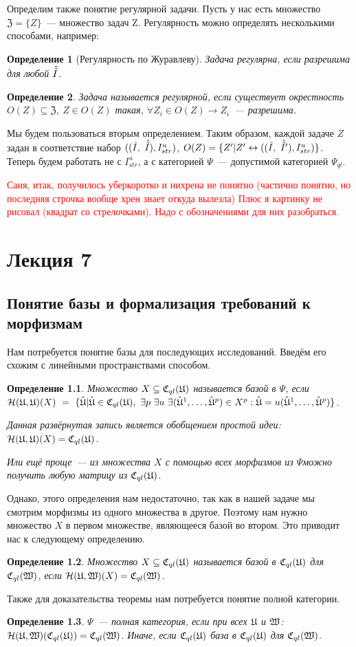 \documentclass[a4paper, 12pt]{report}
\newtheorem{definition}{Определение}[chapter]
\begin{document}
Определим также понятие регулярной задачи. Пусть у нас есть множество $\mathfrak{Z}=\{Z\}$~--- множество задач Z. Регулярность можно определять несколькими способами, например:
\begin{definition}[Регулярность по Журавлеву]
Задача регулярна, если разрешима для любой $\hat{\tilde{I}}$.
\end{definition}
\begin{definition}
Задача называется регулярной, если существует окрестность $O(Z)\subseteq \mathfrak{Z},\ Z\in O(Z)$ такая, $\forall Z_i\in O(Z) \rightarrow Z_i$~--- разрешима.
\end{definition}
Мы будем пользоваться вторым определением.
Таким образом, каждой задаче $Z$ задан в соответствие набор $((\hat{I},\ \hat{\tilde{I}}), I_{str}^u)$, $O(Z) = \{Z'| Z' \leftrightarrow ((\hat{I},\ \hat{\tilde{I}}'), I_{str}^u)\}$. Теперь будем работать не с $I^u_{str}$, а с категорией $\Psi$~--- допустимой категорией $\Psi_{ql}$.

\textcolor{red}{Саня, итак, получилось уберкоротко и нихрена не понятно (частично понятно, но последняя строчка вообще хрен знает откуда вылезла) Плюс я картинку не рисовал (квадрат со стрелочками). Надо с обозначениями для них разобраться.}

\chapter{Лекция 7}
\section{Понятие базы и формализация требований к морфизмам}
Нам потребуется понятие базы для последующих исследований. Введём его схожим с линейными пространствами способом.
\begin{definition}
Множество $X\subseteq \mathfrak{C}_{ql}(\mathfrak{U})$ называется базой в $\Psi$, если $\mathcal{H}(\mathfrak{U},\mathfrak{U})(X)\ =\ \{\hat{\mathfrak{U}}| \hat{\mathfrak{U}} \in \mathfrak{C}_{ql}(\mathfrak{U}),\ \exists p\ \exists u\ \exists (\hat{\mathfrak{U}}^1,\ldots,\hat{\mathfrak{U}}^p) \in X^p: \hat{\mathfrak{U}} = u(\hat{\mathfrak{U}}^1,\ldots,\hat{\mathfrak{U}}^p)\}$.

Данная развёрнутая запись является обобщением простой идеи:  $\mathcal{H}(\mathfrak{U},\mathfrak{U})(X) = \mathfrak{C}_{ql}(\mathfrak{U})$.

Или ещё проще~--- из множества $X$ с помощью всех морфизмов из $\Psi $можно получить любую матрицу из $\mathfrak{C}_{ql}(\mathfrak{U})$.
\end{definition}
Однако, этого определения нам недостаточно, так как в нашей задаче мы смотрим морфизмы из одного множества в другое. Поэтому нам нужно множество $X$ в первом множестве, являющееся базой во втором. Это приводит нас к следующему определению.
\begin{definition}
Множество $X\subseteq \mathfrak{C}_{ql}(\mathfrak{U})$ называется базой в $\mathfrak{C}_{ql}(\mathfrak{U})$ для $\mathfrak{C}_{ql}(\mathfrak{W})$, если $\mathcal{H}(\mathfrak{U},\mathfrak{W})(X) = \mathfrak{C}_{ql}(\mathfrak{W})$.
\end{definition}
Также для доказательства теоремы нам потребуется понятие полной категории.
\begin{definition}
$\Psi$~--- полная категория, если при всех $\mathfrak{U}$ и  $\mathfrak{W}$: $\mathcal{H}(\mathfrak{U},\mathfrak{W})(\mathfrak{C}_{ql}(\mathfrak{U})) = \mathfrak{C}_{ql}(\mathfrak{W})$. Иначе, если $\mathfrak{C}_{ql}(\mathfrak{U})$ база в $\mathfrak{C}_{ql}(\mathfrak{U})$ для $\mathfrak{C}_{ql}(\mathfrak{W})$.
\end{definition}
\end{document}
